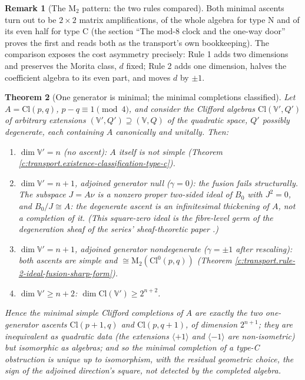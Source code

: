 \documentclass[11pt]{article}
\newtheorem{theorem}{Theorem}[section]
\theoremstyle{definition}
\newtheorem{remark}[theorem]{Remark}
\theoremstyle{plain}
\newcommand{\changedmark}[2]{\marginpar{\raggedright\scriptsize\color{#1}#2}}
\providecommand{\Cl}{}\renewcommand{\Cl}{\mathrm{Cl}}
\providecommand{\Mat}{}\renewcommand{\Mat}{\mathrm{M}}
\begin{document}
\begin{remark}[The $\Mat_2$ pattern: the two rules compared]\label{c:note.transport.2-pattern-two-rules-compared}
Both minimal ascents turn out to be $2 \times 2$ matrix amplifications, of the whole algebra for type N and of its even half for type C (the section ``The mod-8 clock and the one-way door'' proves the first and reads both as the transport's own bookkeeping). The comparison exposes the cost asymmetry precisely: Rule 1 adds two dimensions and preserves the Morita class, $d$ fixed; Rule 2 adds one dimension, halves the coefficient algebra to its even part, and moves $d$ by $\pm 1$.
\end{remark}

\begin{theorem}[One generator is minimal; the minimal completions classified]\label{c:transport.one-generator-minimal-minimal-completions-classified}
\changedmark{BurntOrange}{changed since the deposit}
Let $A = \Cl(p,q)$, $p - q \equiv 1 \pmod 4$, and consider the Clifford algebras $\Cl(\mathbb{V}', Q')$ of arbitrary extensions $(\mathbb{V}', Q') \supseteq (\mathbb{V}, Q)$ of the quadratic space, $Q'$ possibly degenerate, each containing $A$ canonically and unitally. Then:
\begin{enumerate}
\item $\dim \mathbb{V}' = n$ (no ascent): $A$ itself is not simple (Theorem \ref{c:transport.existence-classification-type-c}).
\item $\dim \mathbb{V}' = n + 1$, adjoined generator null ($\gamma = 0$): the fusion fails structurally. The subspace $J = A\nu$ is a nonzero proper two-sided ideal of $B_0$ with $J^2 = 0$, and $B_0 / J \cong A$: the degenerate ascent is an infinitesimal thickening of $A$, not a completion of it. (This square-zero ideal is the fibre-level germ of the degeneration sheaf of the series' sheaf-theoretic paper \cite{ButlerT4}.)
\item $\dim \mathbb{V}' = n + 1$, adjoined generator nondegenerate ($\gamma = \pm 1$ after rescaling): both ascents are simple and $\cong \Mat_2(\Cl^0(p,q))$ (Theorem \ref{c:transport.rule-2-ideal-fusion-sharp-form}).
\item $\dim \mathbb{V}' \geq n + 2$: $\dim \Cl(\mathbb{V}') \geq 2^{n+2}$.
\end{enumerate}
Hence the minimal simple Clifford completions of $A$ are exactly the two one-generator ascents $\Cl(p{+}1,q)$ and $\Cl(p,q{+}1)$, of dimension $2^{n+1}$; they are inequivalent as quadratic data (the extensions $\langle +1 \rangle$ and $\langle -1 \rangle$ are non-isometric) but isomorphic as algebras; and so the minimal completion of a type-C obstruction is \emph{unique up to isomorphism}, with the residual geometric choice, the sign of the adjoined direction's square, not detected by the completed algebra.
\end{theorem}
\end{document}
